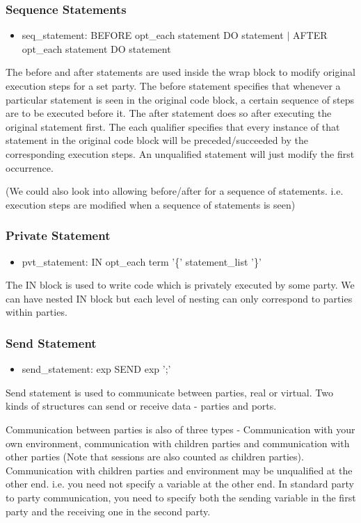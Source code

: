 \subsubsection{Sequence Statements}
\begin{itemize}
\item seq\_statement: BEFORE opt\_each statement DO statement $|$ AFTER opt\_each statement DO statement
\end{itemize}

The before and after statements are used inside the wrap block to modify original execution steps for a set party. The before statement specifies that whenever a particular statement is seen in the original code block, a certain sequence of steps are to be executed before it. The after statement does so after executing the original statement first. The each qualifier specifies that every instance of that statement in the original code block will be preceded/succeeded by the corresponding execution steps. An unqualified statement will just modify the first occurrence.

(We could also look into allowing before/after for a sequence of statements. i.e. execution steps are modified when a sequence of statements is seen)

\subsubsection{Private Statement}
\begin{itemize}
\item pvt\_statement: IN opt\_each term '\{' statement\_list '\}'
\end{itemize}

The IN block is used to write code which is privately executed by some party. We can have nested IN block but each level of nesting can only correspond to parties within parties.

\subsubsection{Send Statement}
\begin{itemize}
\item send\_statement: exp SEND exp ';'
\end{itemize}

Send statement is used to communicate between parties, real or virtual. Two kinds of structures can send or receive data - parties and ports.

Communication between parties is also of three types - Communication with your own environment, communication with children parties and communication with other parties (Note that sessions are also counted as children parties). Communication with children parties and environment may be unqualified at the other end. i.e. you need not specify a variable at the other end. In standard party to party communication, you need to specify both the sending variable in the first party and the receiving one in the second party.

